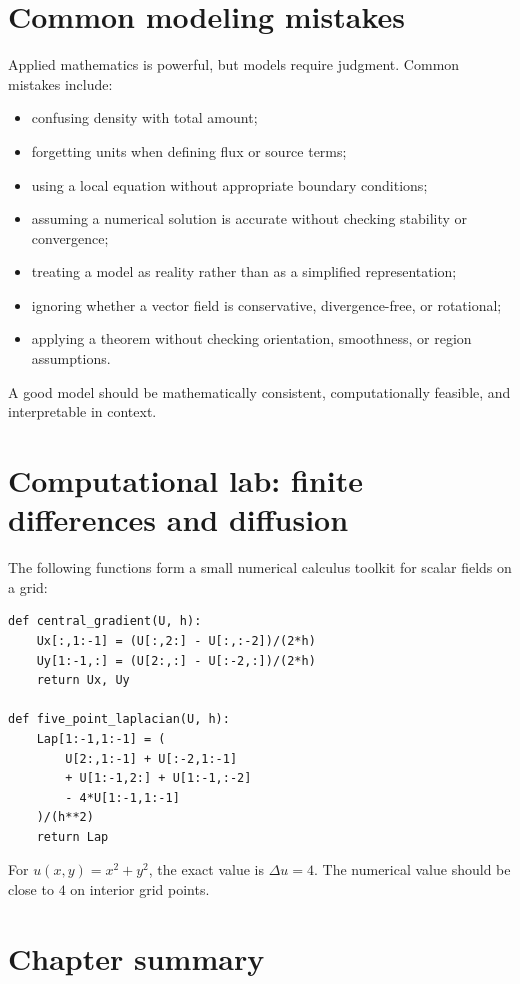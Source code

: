 \documentclass[11pt]{article}
\newcommand{\Lap}{\Delta}
\begin{document}
\section{Common modeling mistakes}

Applied mathematics is powerful, but models require judgment. Common mistakes include:
\begin{itemize}
  \item confusing density with total amount;
  \item forgetting units when defining flux or source terms;
  \item using a local equation without appropriate boundary conditions;
  \item assuming a numerical solution is accurate without checking stability or convergence;
  \item treating a model as reality rather than as a simplified representation;
  \item ignoring whether a vector field is conservative, divergence-free, or rotational;
  \item applying a theorem without checking orientation, smoothness, or region assumptions.
\end{itemize}
A good model should be mathematically consistent, computationally feasible, and interpretable in context.

\section{Computational lab: finite differences and diffusion}

The following functions form a small numerical calculus toolkit for scalar fields on a grid:
\begin{verbatim}
def central_gradient(U, h):
    Ux[:,1:-1] = (U[:,2:] - U[:,:-2])/(2*h)
    Uy[1:-1,:] = (U[2:,:] - U[:-2,:])/(2*h)
    return Ux, Uy

def five_point_laplacian(U, h):
    Lap[1:-1,1:-1] = (
        U[2:,1:-1] + U[:-2,1:-1]
        + U[1:-1,2:] + U[1:-1,:-2]
        - 4*U[1:-1,1:-1]
    )/(h**2)
    return Lap
\end{verbatim}
For $u(x,y)=x^2+y^2$, the exact value is $\Lap u=4$. The numerical value should be close to $4$ on interior grid points.

\section{Chapter summary}
\end{document}
